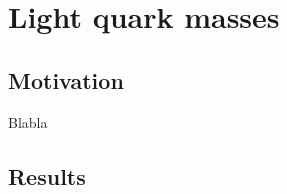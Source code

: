 \chapter{Light quark masses}


\label{ch_qm}


\section{Motivation}
\label{ch_qm:sec:introduction}

Blabla


\section{Results}
\label{ch_qm:sec:Results}

